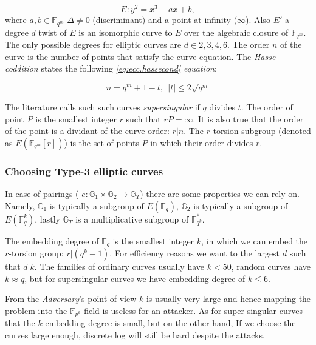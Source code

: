 \begin{equation}
	\label{eq:ecc.weierstrass}
	E: y^2 = x^3 + ax + b,
\end{equation}
where $a,b \in \mathbb{F}_{q^m}$ $\Delta \neq 0 $ (discriminant)
and a point at infinity ($\infty$).\cite{ecc.fam.param} Also $E'$ a degree $d$ twist of $E$ is an isomorphic curve to $E$ over the algebraic closure of $\mathbb{F}_{q^m}$. The only possible
degrees for elliptic curves are $d \in {2,3,4,6}$.\cite{ecc.fam.param} The order $n$ of the curve is the number of points that satisfy the curve equation. The \textit{Hasse coddition} states the following
\textit{\ref{eq:ecc.hassecond} equation}:

\begin{equation}
	\label{eq:ecc.hassecond}
	n = q^m +1 - t,~~ \lvert t \rvert \leq 2 \sqrt{q^m}
\end{equation}

The literature calls such such curves \textit{supersingular} if $q$ divides $t$. The order of point $P$ is the smallest integer $r$ such that $rP = \infty$. It is also true that the order of the point
is a dividant of the curve order: $r|n$. The $r$-torsion subgroup (denoted as $E(\mathbb{F}_{q^m}[r])$) is the set of points $P$ in which their order divides $r$.\cite{ecc.fam.param}


\subsubsection{Choosing Type-3 elliptic curves}
\label{sec:apx.ecc.curves.pairing}

In case of pairings ( $e: \mathbb{G}_1 \times \mathbb{G}_2 \rightarrow \mathbb{G}_T $) there are some properties we can rely on.
Namely, $\mathbb{G}_1$ is typically a subgroup of $E(\mathbb{F}_q)$,
$\mathbb{G}_2$ is typically a subgroup of $E(\mathbb{F}_q^k)$,
lastly $\mathbb{G}_T$ is a multiplicative subgroup of $\mathbb{F}^*_{q^k}$.\cite{ecc.fam.param}

The embedding degree of $\mathbb{F}_q$ is the smallest integer $k$,
in which we can embed the $r$-torsion group: $r|(q^k-1)$. For efficiency reasons
we want to the largest $d$ such that $d|k$.\cite{ecc.fam.param}
The families of ordinary curves usually have $k < 50$, random curves have
$k \approx q$, but for supersingular curves we have embedding degree of
$k \leq 6$.\cite{ecc.fam.param}

From the \textit{Adversary}'s point of view $k$ is usually very large and hence mapping
the problem into the $\mathbb{F}_{p^k}$ ﬁeld is useless for an attacker.
As for super-singular curves that the $k$ embedding degree
is small, but on the other hand, If we choose the curves large enough,
discrete log will still be hard despite the attacks.\cite{crypto.ivan.cryptology}

